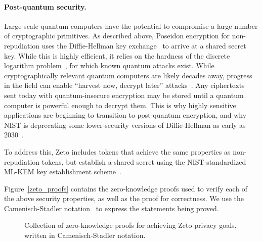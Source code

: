 \paragraph{Post-quantum security.} Large-scale quantum computers have the potential to compromise a large number of cryptographic primitives. As described above, Poseidon encryption for non-repudiation uses the Diffie-Hellman key exchange~\cite{TODO} to arrive at a shared secret key. While this is highly efficient, it relies on the hardness of the discrete logarithm problem~\cite{TODO}, for which known quantum attacks exist. While cryptographically relevant quantum computers are likely decades away, progress in the field can enable ``harvest now, decrypt later'' attacks~\cite{TODO}. Any ciphertexts sent today with quantum-insecure encryption may be stored until a quantum computer is powerful enough to decrypt them. This is why highly sensitive applications are beginning to transition to post-quantum encryption, and why NIST is deprecating some lower-security versions of Diffie-Hellman as early as 2030~\cite{TODO}.

To address this, Zeto includes tokens that achieve the same properties as non-repudiation tokens, but establish a shared secret using the NIST-standardized ML-KEM key establishment scheme~\cite{TODO}.

Figure~\ref{zeto_proofs} contains the zero-knowledge proofs used to verify each of the above security properties, as well as the proof for correctness. We use the Camenisch-Stadler notation~\cite{TODO} to express the statements being proved.

\begin{figure*}
    \centering
    \begin{pcvstack}[boxed, center, space=2em]








    \end{pcvstack}
    \caption{Collection of zero-knowledge proofs for achieving Zeto privacy goals, written in Camenisch-Stadler notation.}
    \label{fig:zeto_proofs}
\end{figure*}


